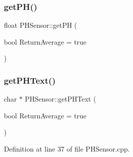 \subsubsection{\texorpdfstring{get\+P\+H()}{getPH()}\hspace{0.1cm}{\footnotesize\ttfamily [2/2]}}
{\footnotesize\ttfamily float P\+H\+Sensor\+::get\+PH (\begin{DoxyParamCaption}\item[{bool}]{Return\+Average = {\ttfamily true} }\end{DoxyParamCaption})}

\mbox{\label{class_p_h_sensor_afa1a5158732cd57ffb41ae089bf8850f}} 
\subsubsection{\texorpdfstring{get\+P\+H\+Text()}{getPHText()}\hspace{0.1cm}{\footnotesize\ttfamily [1/2]}}
{\footnotesize\ttfamily char $\ast$ P\+H\+Sensor\+::get\+P\+H\+Text (\begin{DoxyParamCaption}\item[{bool}]{Return\+Average = {\ttfamily true} }\end{DoxyParamCaption})}



Definition at line 37 of file P\+H\+Sensor.\+cpp.

